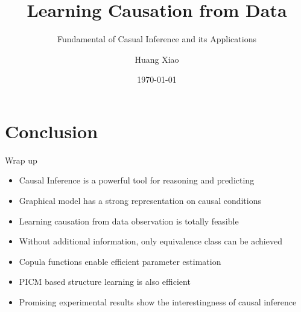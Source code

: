 \documentclass{beamer}
\begin{document}
\title{Learning Causation from Data}
\subtitle{Fundamental of Casual Inference and its Applications}
\author{Huang Xiao} %

\date{\today}
\maketitle








\section{Conclusion}
\begin{frame}{Wrap up}
\begin{itemize}
\item Causal Inference is a powerful tool for reasoning and predicting
\item Graphical model has a strong representation on causal conditions
\item Learning causation from data observation is totally feasible
\item Without additional information, only equivalence class can be achieved
\item Copula functions enable efficient parameter estimation
\item PICM based structure learning is also efficient
\item Promising experimental results show the interestingness of causal inference
\end{itemize}
\end{frame}
\end{document}
